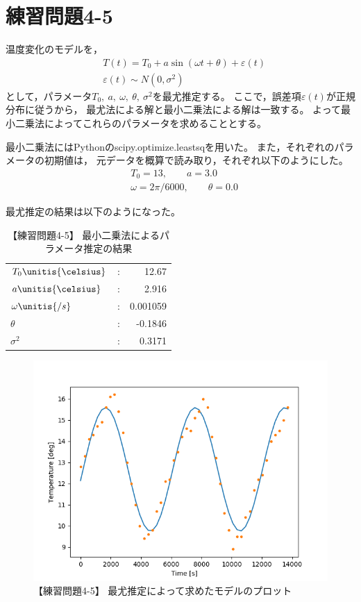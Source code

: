 \documentclass[class=jsarticle, crop=false, dvipdfmx, fleqn]{standalone}
\begin{document}
\section*{練習問題4-5}

温度変化のモデルを，
\begin{align}
& T(t) = T_0 + a\sin(\omega t + \theta) + \varepsilon (t) \\
& \varepsilon (t) \sim N(0, \sigma^2)
\end{align}
として，パラメータ$T_0,\ a,\ \omega,\ \theta,\ {\sigma^2}$を最尤推定する。
ここで，誤差項$\varepsilon (t)$が正規分布に従うから，
最尤法による解と最小二乗法による解は一致する。
よって最小二乗法によってこれらのパラメータを求めることとする。

最小二乗法にはPythonのscipy.optimize.leastsqを用いた。
また，それぞれのパラメータの初期値は，
元データを概算で読み取り，それぞれ以下のようにした。
\begin{align*}
& T_0 = 13, \qquad a = 3.0 \\
& \omega = 2\pi/6000, \qquad \theta = 0.0
\end{align*}

最尤推定の結果は以下のようになった。

\begin{table}[H]
\centering
\caption{【練習問題4-5】 最小二乗法によるパラメータ推定の結果}
\begin{tabular}{lcr}
$T_0\unitis{\celsius}$ & : & 12.67 \\
$a\unitis{\celsius}$ & : & 2.916 \\
$\omega\unitis{/s}$ & : & 0.001059 \\
$\theta$ & : & -0.1846 \\
${\sigma}^2$ & : & 0.3171
\end{tabular}
\label{tab:q4-5_result}
\end{table}

\begin{figure}[H]
\centering
\includegraphics[clip, width=12cm]{../figures/q_4_5_2}
\caption{【練習問題4-5】 最尤推定によって求めたモデルのプロット}
\label{fig:q4-5-2_graph}
\end{figure}
\end{document}

